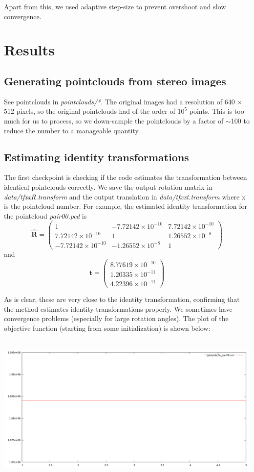 \documentclass[11pt, a4paper]{article}
\begin{document}
\noindent Apart from this, we used adaptive step-size to prevent overshoot and slow convergence.

\section{Results}
\subsection{Generating pointclouds from stereo images}
See pointclouds in \textit{pointclouds/*}. The original images had a resolution of 640 $\times$ 512 pixels, so the original pointclouds had of the order of $10^5$ points. This is too much for us to process, so we down-sample the pointclouds by a factor of $\sim$100 to reduce the number to a manageable quantity.

\subsection{Estimating identity transformations}
The first checkpoint is checking if the code estimates the transformation between identical pointclouds correctly. We save the output rotation matrix in \textit{data/tfxxR.transform} and the output translation in \textit{data/tfxxt.transform} where x is the pointcloud number. For example, the estimated identity transformation for the pointcloud \textit{pair00.pcd} is $$\hat{\textbf{R}} = \begin{pmatrix}
1 & -7.72142 \times 10^{-10} & 7.72142 \times 10^{-10} \\
7.72142 \times 10^{-10} & 1 & 1.26552 \times 10^{-8} \\
-7.72142 \times 10^{-10} & -1.26552 \times 10^{-8} & 1
 \end{pmatrix}$$ and $$\hat{\textbf{t}} = \begin{pmatrix}
8.77619 \times 10^{-10} \\
1.20335 \times 10^{-11} \\
4.22396 \times 10^{-11}
 \end{pmatrix}$$

\noindent As is clear, these are very close to the identity transformation, confirming that the method estimates identity transformations properly. We sometimes have convergence problems (especially for large rotation angles). The plot of the objective function (starting from some initialization) is shown below: \\ \\
\centerline{\includegraphics[scale=0.35]{objFn_pair00}}
\end{document}
